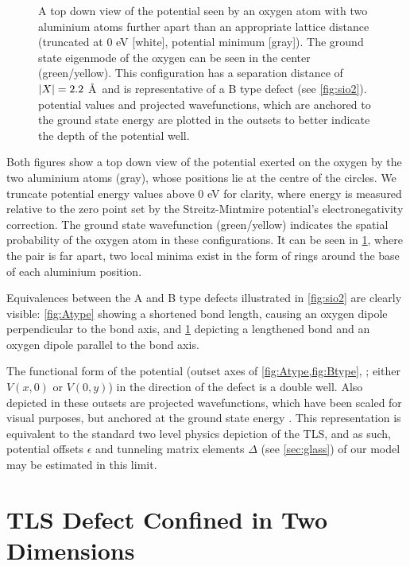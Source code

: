 \begin{figure}[htp]
\resizebox{\textwidth}{!}{}
\caption[B Type Ground State Wavefunction]{\label{fig:Btype}A top down view of the potential seen by an oxygen atom with two aluminium atoms further apart than an appropriate lattice distance (truncated at $0$ eV [white], potential minimum [gray]). The ground state eigenmode of the oxygen can be seen in the center (green/yellow). This configuration has a separation distance of $\lvert X\rvert = 2.2$ \AA\ and is representative of a B type defect (see \cref{fig:sio2}).   potential values and projected wavefunctions, which are anchored to the ground state energy  are plotted in the outsets to better indicate the depth of the potential well.}
\end{figure}

Both figures show a top down view of the potential exerted on the oxygen by the two aluminium atoms (gray), whose positions lie at the centre of the circles.
We truncate potential energy values above $0$ eV for clarity, where energy is measured relative to the zero point set by the Streitz-Mintmire potential's electronegativity correction. The ground state wavefunction (green/yellow) indicates the spatial probability of the oxygen atom in these configurations.
It can be seen in \cref{fig:Btype}, where the pair is far apart, two local minima exist in the form of rings around the base of each aluminium position.

Equivalences between the A and B type defects illustrated in \cref{fig:sio2} are clearly visible: \cref{fig:Atype} showing a shortened bond length, causing an oxygen dipole perpendicular to the bond axis, and \cref{fig:Btype} depicting a lengthened bond and an oxygen dipole parallel to the bond axis.

The functional form of the  potential (outset axes of \cref{fig:Atype,fig:Btype}, ; either $V(x,0)$ or $V(0,y)$) in the direction of the defect is a double well.
Also depicted in these outsets are projected wavefunctions, which have been scaled for visual purposes, but anchored at the ground state energy .
This representation is equivalent to the standard two level physics depiction of the TLS, and as such, potential offsets $\epsilon$ and tunneling matrix elements $\Delta$ (see \cref{sec:glass}) of our model may be estimated in this limit.

\section{TLS Defect Confined in Two Dimensions}\label{sec:2d}

